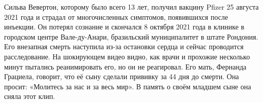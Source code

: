 Сильва Вевертон, которому было всего 13 лет, получил вакцину Pfizer 25 августа
2021 года и страдал от многочисленных симптомов, появившихся после инъекции. Он
потерял сознание и скончался 8 октября 2021 года в клинике в городском центре
Вале-ду-Анари, бразильский муниципалитет в штате Рондония. Его внезапная смерть
наступила из-за остановки сердца и сейчас проводится расследование. На
шокирующем видео видно, как врачи и прохожие несколько минут пытались
реанимировать его, но он не реагировал. Его мать, Фернанда Грациела, говорит,
что её сыну сделали прививку за 44 дня до смерти. Она просит: «Молитесь за нас и
за весь мир». В память о своём младшем сыне она сняла этот клип.
